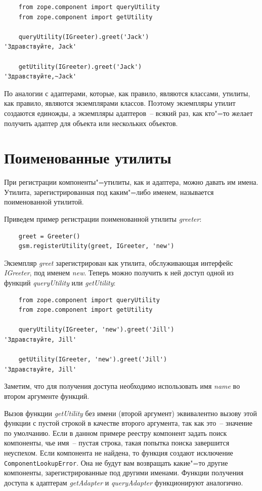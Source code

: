 \documentclass[a4paper,openany,twoside,final]{book}
\providecommand*{\DUroletitlereference}[1]{\textsl{#1}}
\begin{document}
\begin{verbatim}
    from zope.component import queryUtility
    from zope.component import getUtility

    queryUtility(IGreeter).greet('Jack')
'Здравствуйте, Jack'

    getUtility(IGreeter).greet('Jack')
'Здравствуйте,~Jack'
\end{verbatim}

По аналогии с адаптерами, которые, как правило, являются классами, утилиты, как правило, являются экземплярами классов.  Поэтому экземпляры утилит создаются единожды, а экземпляры адаптеров~-- всякий раз, как кто"=то желает получить адаптер для объекта или нескольких объектов.


\section{Поименованные утилиты%
  \label{id42}%
}

При регистрации компоненты"=утилиты, как и адаптера, можно давать им имена.  Утилита, зарегистрированная под каким"=либо именем, называется поименованной утилитой.

Приведем пример регистрации поименованной утилиты \DUroletitlereference{greeter}:

\begin{verbatim}
    greet = Greeter()
    gsm.registerUtility(greet, IGreeter, 'new')
\end{verbatim}

Экземпляр \DUroletitlereference{greet} зарегистрирован как утилита, обслуживающая интерфейс \DUroletitlereference{IGreeter}, под именем \DUroletitlereference{new}.  Теперь можно получить к ней доступ одной из функций \DUroletitlereference{queryUtility} или \DUroletitlereference{getUtility}:

\begin{verbatim}
    from zope.component import queryUtility
    from zope.component import getUtility

    queryUtility(IGreeter, 'new').greet('Jill')
'Здравствуйте, Jill'

    getUtility(IGreeter, 'new').greet('Jill')
'Здравствуйте, Jill'
\end{verbatim}

Заметим, что для получения доступа необходимо использовать имя \DUroletitlereference{name} во втором аргументе функций.

Вызов функции \DUroletitlereference{getUtility} без имени (второй аргумент) эквивалентно вызову этой функции с пустой строкой в качестве второго аргумента, так как это~-- значение по умолчанию.  Если в данном примере реестру компонент задать поиск компоненты, чье имя~-- пустая строка, такая попытка поиска завершится неуспехом.  Если компонента не найдена, то функция создают исключение \texttt{ComponentLookupError}.  Она не будут вам возвращать какие"=то другие компоненты, зарегистрированные под другими именами.  Функции получения доступа к адаптерам \DUroletitlereference{getAdapter} и \DUroletitlereference{queryAdapter} функционируют аналогично.
\end{document}
